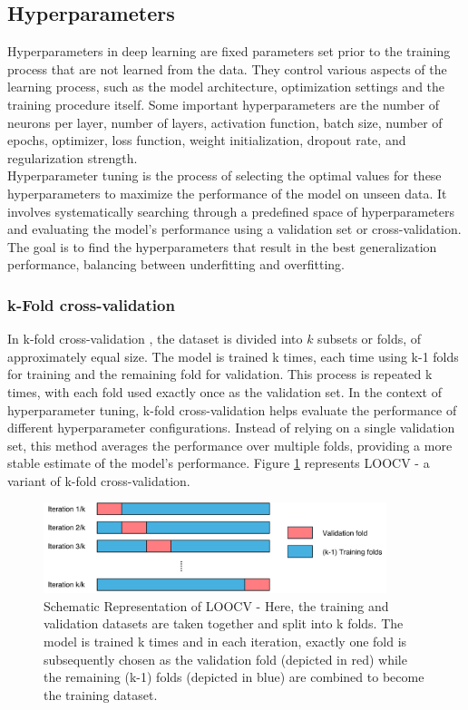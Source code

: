 \subsection{Hyperparameters}\label{section:hyperparameters}
Hyperparameters in deep learning are fixed parameters set prior to the training process that are not learned from the data. They control various aspects of the learning process, such as the model architecture, optimization settings and the training procedure itself. Some important hyperparameters are the number of neurons per layer, number of layers, activation function, batch size, number of epochs, optimizer, loss function, weight initialization, dropout rate, and regularization strength. \\
Hyperparameter tuning is the process of selecting the optimal values for these hyperparameters to maximize the performance of the model on unseen data. It involves systematically searching through a predefined space of hyperparameters and evaluating the model's performance using a validation set or cross-validation. The goal is to find the hyperparameters that result in the best generalization performance, balancing between underfitting and overfitting.
\subsubsection{k-Fold cross-validation}
In k-fold cross-validation \cite{cv}, the dataset is divided into $k$ subsets or folds, of approximately equal size. The model is trained k times, each time using k-1 folds for training and the remaining fold for validation. This process is repeated k times, with each fold used exactly once as the validation set. In the context of hyperparameter tuning, k-fold cross-validation helps evaluate the performance of different hyperparameter configurations. Instead of relying on a single validation set, this method averages the performance over multiple folds, providing a more stable estimate of the model's performance. Figure \ref{fig:crossval} represents \gls{LOOCV} - a variant of k-fold cross-validation. 
\begin{figure}[ht]
  \centering
  \includegraphics[width=10cm]{images/Theory-DL/crossval.png}
  \caption{Schematic Representation of LOOCV - Here, the training and validation datasets are taken together and split into k folds. The model is trained k times and in each iteration, exactly one fold is subsequently chosen as the validation fold (depicted in red) while the remaining (k-1) folds (depicted in blue) are combined to become the training dataset.}
  \label{fig:crossval}
\end{figure}
